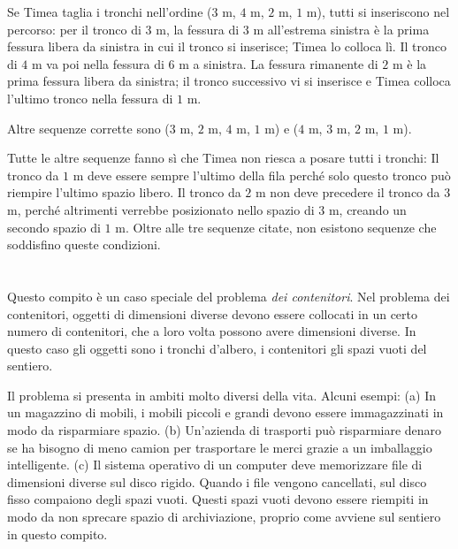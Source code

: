 {{{\centering%
\par}

Se Timea taglia i tronchi nell’ordine ($3$ m, $4$ m, $2$ m, $1$ m), tutti si inseriscono nel percorso: per il tronco di $3$ m, la fessura di $3$ m all’estrema sinistra è la prima fessura libera da sinistra in cui il tronco si inserisce; Timea lo colloca lì. Il tronco di $4$ m va poi nella fessura di $6$ m a sinistra. La fessura rimanente di $2$ m è la prima fessura libera da sinistra; il tronco successivo vi si inserisce e Timea colloca l’ultimo tronco nella fessura di $1$ m.

Altre sequenze corrette sono ($3$ m, $2$ m, $4$ m, $1$ m) e ($4$ m, $3$ m, $2$ m, $1$ m).

Tutte le altre sequenze fanno sì che Timea non riesca a posare tutti i tronchi: Il tronco da $1$ m deve essere sempre l’ultimo della fila perché solo questo tronco può riempire l’ultimo spazio libero. Il tronco da $2$ m non deve precedere il tronco da $3$ m, perché altrimenti verrebbe posizionato nello spazio di $3$ m, creando un secondo spazio di $1$ m. Oltre alle tre sequenze citate, non esistono sequenze che soddisfino queste condizioni.



\section*{\BrochureItsInformatics}
Questo compito è un caso speciale del problema \emph{dei contenitori}. Nel problema dei contenitori, oggetti di dimensioni diverse devono essere collocati in un certo numero di contenitori, che a loro volta possono avere dimensioni diverse. In questo caso gli oggetti sono i tronchi d’albero, i contenitori gli spazi vuoti del sentiero.

Il problema si presenta in ambiti molto diversi della vita. Alcuni esempi: (a) In un magazzino di mobili, i mobili piccoli e grandi devono essere immagazzinati in modo da risparmiare spazio. (b) Un’azienda di trasporti può risparmiare denaro se ha bisogno di meno camion per trasportare le merci grazie a un imballaggio intelligente. (c) Il sistema operativo di un computer deve memorizzare file di dimensioni diverse sul disco rigido. Quando i file vengono cancellati, sul disco fisso compaiono degli spazi vuoti. Questi spazi vuoti devono essere riempiti in modo da non sprecare spazio di archiviazione, proprio come avviene sul sentiero in questo compito.

}}
